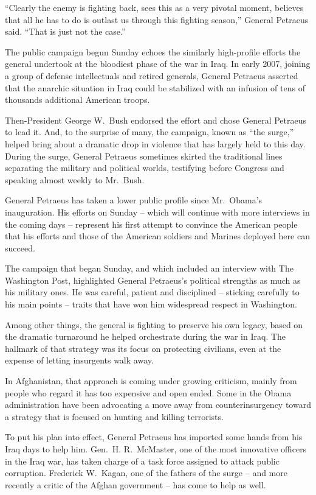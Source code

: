 ﻿\documentclass[12pt]{article}
\begin{document}
``Clearly the enemy is fighting back, sees this as a very pivotal moment, believes that all he has
to do is outlast us through this fighting season,'' General Petraeus said. ``That is just not the
case.''

The public campaign begun Sunday echoes the similarly high-profile efforts the general undertook at
the bloodiest phase of the war in Iraq. In early 2007, joining a group of defense intellectuals and
retired generals, General Petraeus asserted that the anarchic situation in Iraq could be stabilized
with an infusion of tens of thousands additional American troops.

Then-President George W.~Bush endorsed the effort and chose General Petraeus to lead it. And, to the
surprise of many, the campaign, known as ``the surge,'' helped bring about a dramatic drop in
violence that has largely held to this day. During the surge, General Petraeus sometimes skirted the
traditional lines separating the military and political worlds, testifying before Congress and
speaking almost weekly to Mr.~Bush.

General Petraeus has taken a lower public profile since Mr.~Obama's inauguration. His efforts on
Sunday -- which will continue with more interviews in the coming days -- represent his first attempt
to convince the American people that his efforts and those of the American soldiers and Marines
deployed here can succeed.

The campaign that began Sunday, and which included an interview with The Washington Post,
highlighted General Petraeus's political strengths as much as his military ones. He was careful,
patient and disciplined -- sticking carefully to his main points -- traits that have won him
widespread respect in Washington.

Among other things, the general is fighting to preserve his own legacy, based on the dramatic
turnaround he helped orchestrate during the war in Iraq. The hallmark of that strategy was its focus
on protecting civilians, even at the expense of letting insurgents walk away.

In Afghanistan, that approach is coming under growing criticism, mainly from people who regard it
has too expensive and open ended. Some in the Obama administration have been advocating a move away
from counterinsurgency toward a strategy that is focused on hunting and killing terrorists.

To put his plan into effect, General Petraeus has imported some hands from his Iraq days to help
him. Gen.~H. R.~McMaster, one of the most innovative officers in the Iraq war, has taken charge of a
task force assigned to attack public corruption. Frederick W.~Kagan, one of the fathers of the surge
-- and more recently a critic of the Afghan government -- has come to help as well.
\end{document}
